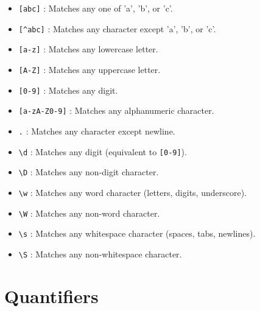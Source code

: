 \begin{itemize}

    \item \texttt{[abc]} : Matches any one of 'a', 'b', or 'c'.
    
    \item \texttt{[\^}\texttt{abc]} : Matches any character except 'a', 'b', or 'c'.

    \item \texttt{[a-z]} : Matches any lowercase letter.

    \item \texttt{[A-Z]} : Matches any uppercase letter.

    \item \texttt{[0-9]} : Matches any digit.

    \item \texttt{[a-zA-Z0-9]} : Matches any alphanumeric character.

    \item \texttt{.} : Matches any character except newline.

    \item \texttt{\textbackslash d} : Matches any digit (equivalent to \texttt{[0-9]}).

    \item \texttt{\textbackslash D} : Matches any non-digit character.

    \item \texttt{\textbackslash w} : Matches any word character (letters, digits, underscore).

    \item \texttt{\textbackslash W} : Matches any non-word character.

    \item \texttt{\textbackslash s} : Matches any whitespace character (spaces, tabs, newlines).

    \item \texttt{\textbackslash S} : Matches any non-whitespace character.

\end{itemize}

\section{Quantifiers}


